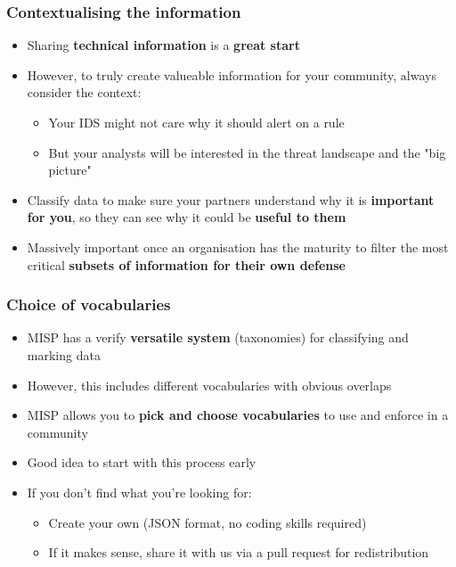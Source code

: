 \begin{frame}
\frametitle{Contextualising the information}
\begin{itemize}
    \item Sharing {\bf technical information} is a {\bf great start}
	\item However, to truly create valueable information for your community, always consider the context:
	\begin{itemize}
		\item Your IDS might not care why it should alert on a rule
		\item But your analysts will be interested in the threat landscape and the "big picture"
	\end{itemize}
    \item Classify data to make sure your partners understand why it is {\bf important for you}, so they can see why it could be {\bf useful to them}
    \item Massively important once an organisation has the maturity to filter the most critical {\bf subsets of information for their own defense}
\end{itemize}
\end{frame}

\begin{frame}
\frametitle{Choice of vocabularies}
\begin{itemize}
    \item MISP has a verify {\bf versatile system} (taxonomies) for classifying and marking data
	\item However, this includes different vocabularies with obvious overlaps
    \item MISP allows you to {\bf pick and choose vocabularies} to use and enforce in a community
	\item Good idea to start with this process early
	\item If you don't find what you're looking for:
	\begin{itemize}
		\item Create your own (JSON format, no coding skills required)
		\item If it makes sense, share it with us via a pull request for redistribution
	\end{itemize}
\end{itemize}
\end{frame}


